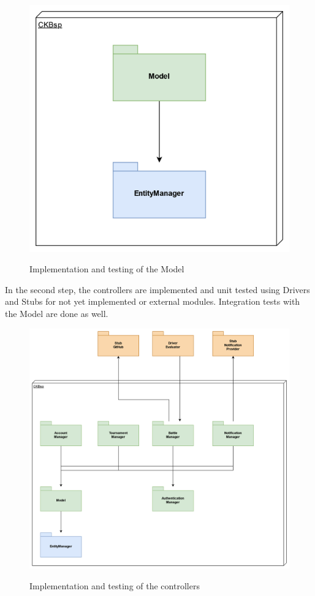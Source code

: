 \documentclass{Configuration_Files/Template}
\begin{document}
\begin{figure}[H]
\centering
\includegraphics[scale = 0.65]{DD_latex/Images/diagrams/ImplementationPlan_SS_First.png}\\
\caption{Implementation and testing of the Model}
\end{figure}

In the second step, the controllers are implemented and unit tested using Drivers and Stubs for not yet implemented or external modules. Integration tests with the Model are done as well.

\begin{figure}[H]
\centering
\includegraphics[scale = 0.65]{DD_latex/Images/diagrams/ImplementationPlan_SS_Second.png}\\
\caption{Implementation and testing of the controllers}
\end{figure}
\end{document}
